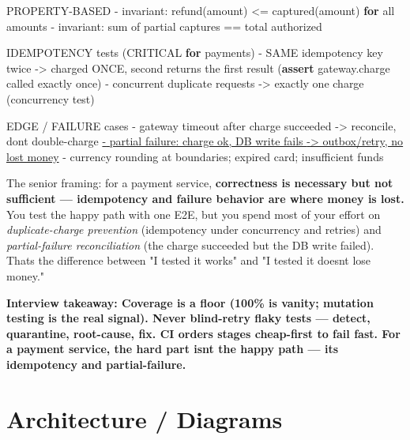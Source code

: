 \documentclass[11pt]{article}
\newenvironment{Shaded}{\begin{snugshade}}{\end{snugshade}}
\newcommand{\BuiltInTok}[1]{\textcolor[rgb]{0.50,0.55,0.55}{#1}}
\newcommand{\ControlFlowTok}[1]{\textcolor[rgb]{0.99,0.74,0.29}{\textbf{#1}}}
\newcommand{\ErrorTok}[1]{\textcolor[rgb]{0.85,0.27,0.33}{\underline{#1}}}
\newcommand{\NormalTok}[1]{\textcolor[rgb]{0.81,0.81,0.76}{#1}}
\newcommand{\OperatorTok}[1]{\textcolor[rgb]{0.81,0.81,0.76}{#1}}
\newcommand{\StringTok}[1]{\textcolor[rgb]{0.96,0.31,0.31}{#1}}
\begin{document}
\begin{Shaded}
\begin{Highlighting}[]
\NormalTok{   PROPERTY}\OperatorTok{{-}}\NormalTok{BASED}
     \OperatorTok{{-}}\NormalTok{ invariant: refund(amount) }\OperatorTok{\textless{}=}\NormalTok{ captured(amount) }\ControlFlowTok{for} \BuiltInTok{all}\NormalTok{ amounts}
     \OperatorTok{{-}}\NormalTok{ invariant: }\BuiltInTok{sum}\NormalTok{ of partial captures }\OperatorTok{==}\NormalTok{ total authorized}

\NormalTok{   IDEMPOTENCY tests (CRITICAL }\ControlFlowTok{for}\NormalTok{ payments)}
     \OperatorTok{{-}}\NormalTok{ SAME idempotency key twice }\OperatorTok{{-}\textgreater{}}\NormalTok{ charged ONCE, second returns the}
\NormalTok{       first result (}\ControlFlowTok{assert}\NormalTok{ gateway.charge called exactly once)}
     \OperatorTok{{-}}\NormalTok{ concurrent duplicate requests }\OperatorTok{{-}\textgreater{}}\NormalTok{ exactly one charge (concurrency test)}

\NormalTok{   EDGE }\OperatorTok{/}\NormalTok{ FAILURE cases}
     \OperatorTok{{-}}\NormalTok{ gateway timeout after charge succeeded }\OperatorTok{{-}\textgreater{}}\NormalTok{ reconcile, don}\StringTok{\textquotesingle{}t double{-}charge}
\ErrorTok{     {-} partial failure: charge ok, DB write fails {-}\textgreater{} outbox/retry, no lost money}
     \OperatorTok{{-}}\NormalTok{ currency rounding at boundaries}\OperatorTok{;}\NormalTok{ expired card}\OperatorTok{;}\NormalTok{ insufficient funds}
\end{Highlighting}
\end{Shaded}

The senior framing: for a payment service, \textbf{correctness is necessary but not sufficient --- idempotency and failure behavior are where money is lost.} You test the happy path with one E2E, but you spend most of your effort on \emph{duplicate-charge prevention} (idempotency under concurrency and retries) and \emph{partial-failure reconciliation} (the charge succeeded but the DB write failed). That\textquotesingle s the difference between "I tested it works" and "I tested it doesn\textquotesingle t lose money."

\textbf{Interview takeaway: Coverage is a floor (100\% is vanity; mutation testing is the real signal). Never blind-retry flaky tests --- detect, quarantine, root-cause, fix. CI orders stages cheap-first to fail fast. For a payment service, the hard part isn\textquotesingle t the happy path --- it\textquotesingle s idempotency and partial-failure.}

\section{Architecture / Diagrams}\label{architecture--diagrams}
\end{document}
